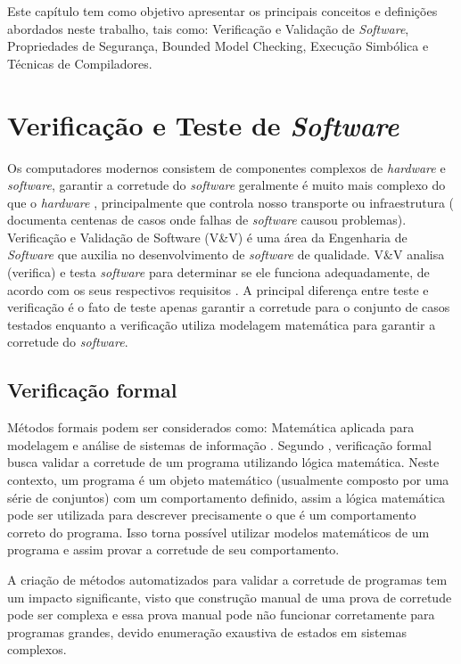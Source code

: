 \label{chapter:conceitos}
Este capítulo tem como objetivo apresentar os principais conceitos e definições abordados neste trabalho, tais como: Verificação e Validação de \textit{Software}, Propriedades de Segurança, Bounded Model Checking, Execução Simbólica e Técnicas de Compiladores.


\section{Verificação e Teste de \textit{Software}}
\label{sec:vv}
Os computadores modernos consistem de componentes complexos de \textit{hardware} e \textit{software}, garantir a corretude do \textit{software} geralmente é muito mais complexo do que o \textit{hardware} \cite{dsilva:2008}, principalmente que controla nosso transporte ou infraestrutura ( documenta centenas de casos onde falhas de \textit{software} causou problemas). Verificação e Validação de Software (V\&V) é uma área da Engenharia de \textit{Software} que auxilia no desenvolvimento de \textit{software} de qualidade. V\&V analisa (verifica) e testa \textit{software} para determinar se ele funciona adequadamente, de acordo com os seus respectivos requisitos \cite{wallace:1989}. A principal diferença entre teste e verificação é o fato de teste apenas garantir a corretude para o conjunto de casos testados enquanto a verificação utiliza modelagem matemática para garantir a corretude do \textit{software}.
 
\subsection{Verificação formal}

Métodos formais podem ser considerados como: Matemática aplicada para modelagem e análise de sistemas de informação \cite{Baier:2008}. Segundo , verificação formal busca validar a corretude de um programa utilizando lógica matemática. Neste contexto, um programa é um objeto matemático (usualmente composto por uma série de conjuntos) com um comportamento definido, assim a lógica matemática pode ser utilizada para descrever precisamente o que é um comportamento correto do programa. Isso torna possível utilizar modelos matemáticos de um programa e assim provar a corretude de seu comportamento. 
\par
A criação de métodos automatizados para validar a corretude de programas tem um impacto significante, visto que construção manual de uma prova de corretude pode ser complexa e essa prova manual pode não funcionar corretamente para programas grandes, devido enumeração exaustiva de estados em sistemas complexos. 


